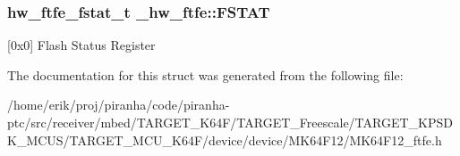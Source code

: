 \subsubsection[{\texorpdfstring{F\+S\+T\+AT}{FSTAT}}]{ {\bf hw\+\_\+ftfe\+\_\+fstat\+\_\+t} \+\_\+hw\+\_\+ftfe\+::\+F\+S\+T\+AT}\hypertarget{struct__hw__ftfe_a70891ecfcb89480b7f44c8d577055141}{}\label{struct__hw__ftfe_a70891ecfcb89480b7f44c8d577055141}
\mbox{[}0x0\mbox{]} Flash Status Register 

The documentation for this struct was generated from the following file\+:\begin{DoxyCompactItemize}
\item 
/home/erik/proj/piranha/code/piranha-\/ptc/src/receiver/mbed/\+T\+A\+R\+G\+E\+T\+\_\+\+K64\+F/\+T\+A\+R\+G\+E\+T\+\_\+\+Freescale/\+T\+A\+R\+G\+E\+T\+\_\+\+K\+P\+S\+D\+K\+\_\+\+M\+C\+U\+S/\+T\+A\+R\+G\+E\+T\+\_\+\+M\+C\+U\+\_\+\+K64\+F/device/device/\+M\+K64\+F12/M\+K64\+F12\+\_\+ftfe.\+h\end{DoxyCompactItemize}

